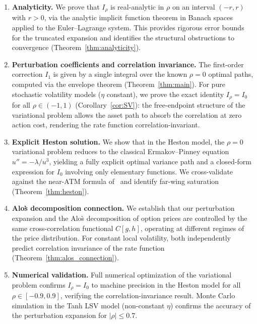 \documentclass[11pt]{article}
\theoremstyle{definition}
\begin{document}
\begin{enumerate}[label=(\roman*)]
  \item \textbf{Analyticity.} We prove that $I_\rho$ is real-analytic in $\rho$ on an interval $(-r,r)$ with $r>0$, via the analytic implicit function theorem in Banach spaces applied to the Euler--Lagrange system. This provides rigorous error bounds for the truncated expansion and identifies the structural obstructions to convergence (Theorem~\ref{thm:analyticity}).

  \item \textbf{Perturbation coefficients and correlation invariance.} The first-order correction $I_1$ is given by a single integral over the known $\rho=0$ optimal paths, computed via the envelope theorem (Theorem~\ref{thm:main}). For pure stochastic volatility models ($\eta$ constant), we prove the exact identity $I_\rho = I_0$ for all $\rho \in (-1,1)$ (Corollary~\ref{cor:SV}): the free-endpoint structure of the variational problem allows the asset path to absorb the correlation at zero action cost, rendering the rate function correlation-invariant.

  \item \textbf{Explicit Heston solution.} We show that in the Heston model, the $\rho=0$ variational problem reduces to the classical Ermakov--Pinney equation $u'' = -\lambda/u^3$, yielding a fully explicit optimal variance path and a closed-form expression for $I_0$ involving only elementary functions. We cross-validate against the near-ATM formula of~\cite{PWZ2025} and identify far-wing saturation (Theorem~\ref{thm:heston}).

  \item \textbf{Alo\`s decomposition connection.} We establish that our perturbation expansion and the Alo\`s decomposition of option prices are controlled by the same cross-correlation functional $C[g,h]$, operating at different regimes of the price distribution. For constant local volatility, both independently predict correlation invariance of the rate function (Theorem~\ref{thm:alos_connection}).

  \item \textbf{Numerical validation.} Full numerical optimization of the variational problem confirms $I_\rho = I_0$ to machine precision in the Heston model for all $\rho \in [-0.9, 0.9]$, verifying the correlation-invariance result. Monte Carlo simulation in the Tanh LSV model (non-constant $\eta$) confirms the accuracy of the perturbation expansion for $|\rho| \leq 0.7$.
\end{enumerate}
\end{document}
